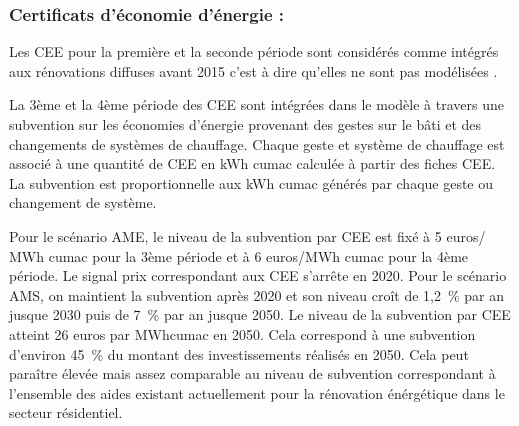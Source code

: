 \documentclass[10.5pt,a4paper]{article}
\begin{document}
{\subsubsection{Certificats d’économie d’énergie : }

Les CEE pour la première et la seconde période sont considérés comme intégrés aux rénovations diffuses avant 2015 c'est à dire qu'elles ne sont pas modélisées .

La 3ème et la 4ème période des CEE sont intégrées dans le modèle à travers une subvention sur les économies d'énergie provenant des gestes sur le bâti et des changements de systèmes de chauffage. Chaque geste et système de chauffage est associé à une quantité de CEE en kWh cumac calculée à partir des fiches CEE. La subvention est proportionnelle aux kWh cumac générés par chaque geste ou changement de système.

Pour le scénario AME, le niveau de la subvention par CEE est fixé à 5 euros/ MWh cumac pour la 3ème période et à 6 euros/MWh cumac pour la 4ème période. Le signal prix correspondant aux CEE s’arrête en 2020. Pour le scénario AMS, on maintient la subvention après 2020 et son niveau croît de 1,2~\% par an jusque 2030 puis de 7~\% par an jusque 2050. Le niveau de la subvention par CEE atteint 26 euros par MWhcumac en 2050. Cela correspond à une subvention d’environ 45~\% du montant des investissements réalisés en 2050. Cela peut paraître élevée mais assez comparable au niveau de subvention correspondant à l'ensemble des aides existant actuellement pour la rénovation énérgétique dans le secteur résidentiel. 

	

}
\end{document}
